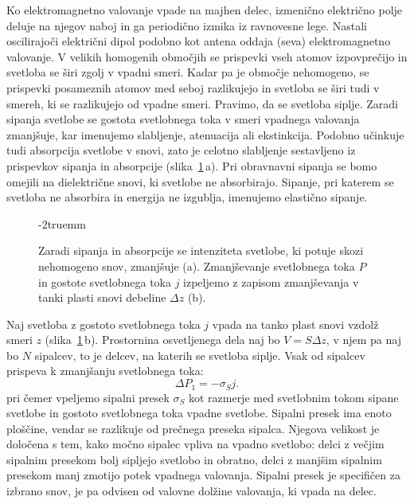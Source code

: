 Ko elektromagnetno valovanje vpade na majhen delec, izmenično električno 
polje deluje na njegov naboj in ga periodično izmika iz ravnovesne lege. 
Nastali oscilirajoči električni dipol 
podobno kot antena oddaja (seva) elektromagnetno valovanje. V velikih 
homogenih območjih se prispevki vseh atomov izpovprečijo in svetloba
se širi zgolj v vpadni smeri. Kadar pa je območje nehomogeno, se 
prispevki posameznih atomov med seboj razlikujejo in svetloba se širi 
tudi v smereh, ki se razlikujejo od vpadne smeri. Pravimo, da se svetloba siplje. 
Zaradi sipanja svetlobe se gostota svetlobnega toka v smeri vpadnega valovanja
zmanjšuje, kar imenujemo slabljenje, atenuacija ali ekstinkcija. Podobno učinkuje tudi 
absorpcija svetlobe v snovi, zato je celotno slabljenje sestavljeno iz 
prispevkov sipanja in absorpcije (slika~\ref{fig:07_skica}\,a). Pri obravnavni sipanja se bomo omejili na 
dielektrične snovi, ki svetlobe ne absorbirajo. Sipanje, pri katerem se 
svetloba ne absorbira in energija ne izgublja, imenujemo elastično sipanje.

\begin{figure}[!ht]
\centering
\def\svgwidth{100truemm} 

\caption{Zaradi sipanja in absorpcije se intenziteta svetlobe, ki potuje skozi 
nehomogeno snov, zmanjšuje (a). Zmanjševanje svetlobnega toka $P$ in 
gostote svetlobnega toka $j$ izpeljemo z zapisom
zmanjševanja v tanki plasti snovi debeline $\Delta z$ (b).}
\label{fig:07_skica}
\vglue-2truemm
\end{figure}

Naj svetloba z gostoto svetlobnega toka $j$ vpada na tanko plast snovi 
vzdolž smeri $z$ (slika~\ref{fig:07_skica}\,b). Prostornina osvetljenega 
dela naj bo $V = S \Delta z$,
v njem pa naj bo $N$ sipalcev, to je delcev, na katerih se svetloba siplje. 
Vsak od sipalcev prispeva k zmanjšanju svetlobnega toka:
\begin{equation}
\Delta P_1 = - \sigma_S j.
\label{eq:07_01}
\end{equation}
pri čemer vpeljemo sipalni presek $\sigma_S$ kot razmerje med svetlobnim 
tokom sipane svetlobe in gostoto svetlobnega toka vpadne svetlobe. 
Sipalni presek ima enoto ploščine, vendar se razlikuje od prečnega preseka sipalca.
Njegova velikost je določena s tem, kako močno sipalec vpliva na vpadno 
svetlobo: delci z večjim sipalnim presekom bolj sipljejo svetlobo in obratno, 
delci z manjšim sipalnim presekom manj zmotijo potek vpadnega valovanja. 
Sipalni presek je specifičen za izbrano snov, je pa odvisen od valovne 
dolžine valovanja, ki vpada na delec. 

